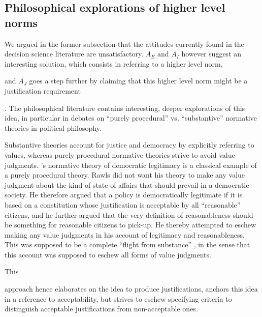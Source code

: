 \documentclass[preprint, french, english, 11pt, authoryear]{elsarticle}%
\begin{document}
\subsection{Philosophical explorations of higher level norms}
\label{sec:higher}
We argued in the former subsection that the attitudes currently found in the decision science literature are unsatisfactory. 
$A_E$ and $A_I$ however suggest an interesting solution, which consists in referring to a higher level norm, \begin{changebar}and $A_J$ goes a step further by claiming that this higher level norm might be a justification requirement\end{changebar}.
The philosophical literature contains interesting, deeper explorations of this idea, in particular in debates on “purely procedural” vs. “substantive” normative theories in political philosophy.

Substantive theories account for justice and democracy by explicitly referring to values, whereas purely procedural normative theories strive to avoid value judgments. 
\cite{rawls_political_2005}’s normative theory of democratic legitimacy is a classical example of a purely procedural theory. 
Rawls did not want his theory to make any value judgment about the kind of state of affairs that should prevail in a democratic society. 
He therefore argued that a policy is democratically legitimate if it is based on a constitution whose justification is acceptable by all  “reasonable” citizens, and he further argued that the very definition of reasonableness should be something for reasonable citizens to pick-up. 
He thereby attempted to eschew making any value judgments in his account of legitimacy and reasonableness. 
This was supposed to be a complete ``flight from substance'' \citep{estlund_democratic_2009}, in the sense that this account was supposed to eschew all forms of value judgments.

This \begin{changebar}approach hence elaborates on the idea to produce justifications, anchors this idea in a reference to acceptability, but strives to eschew specifying criteria to distinguish acceptable justifications from non-acceptable ones.\end{changebar}
\end{document}
